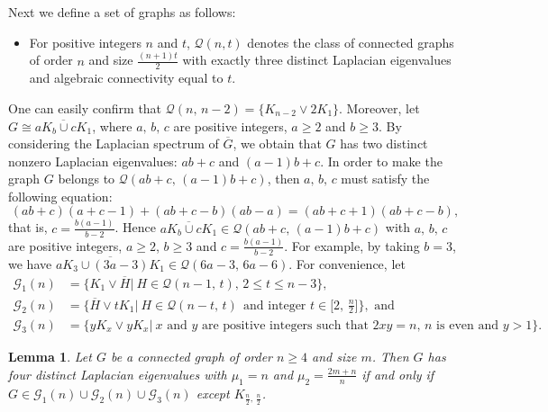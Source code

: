\documentclass[12pt]{article}
\newtheorem{lemma}[theorem]{Lemma}
\begin{document}
Next we  define a set of graphs as follows:
\begin{itemize}
 \item For positive integers $n$ and $t$, $\mathcal{Q}(n,t)$ denotes the class of connected graphs of order $n$ and size $\frac{(n+1)t}{2}$ with exactly three distinct Laplacian eigenvalues and algebraic connectivity equal to $t$. 
\end{itemize}
One can easily confirm that  $\mathcal{Q}(n,\,n-2)=\{K_{n-2}\vee 2K_1\}$.
Moreover, let $G\cong \overline{aK_b\cup cK_1}$, where $a,\,b,\,c$ are positive integers, $a\geq 2$ and $b\geq 3$. By considering the Laplacian spectrum of $\overline{G}$, we obtain that $G$ has two distinct nonzero Laplacian eigenvalues: $ab+c$ and $(a-1)b+c$. In order to make the graph $G$ belongs to 
$\mathcal{Q}(ab+c,\,(a-1)b+c)$, then $a,\,b,\,c$ must satisfy the following equation: 
$$(ab+c)(a+c-1)+(ab+c-b)(ab-a)=(ab+c+1)(ab+c-b),$$
that is, $c=\frac{b(a-1)}{b-2}$. Hence $\overline{aK_b\cup cK_1}\in \mathcal{Q}(ab+c,\,(a-1)b+c)$ with $a,\,b,\,c$ are positive integers, $a\geq 2$, $b\geq 3$ and $c=\frac{b(a-1)}{b-2}$. For example, by taking $b=3$, we have 
$\overline{aK_3\cup (3a-3)K_1}\in \mathcal{Q}(6a-3,\,6a-6)$.
 For convenience, let
 \begin{align*}
 \mathcal{G}_1(n)&=\Big\{K_1\vee\overline{H}|~H\in \mathcal{Q}(n-1,\,t),\,2\leq t\leq n-3\Big\},\\[2mm]
 \mathcal{G}_2(n)&=\Bigg\{\overline{H}\vee tK_1|~H\in \mathcal{Q}(n-t,\,t)~~\mbox{and integer } t\in \Big[2,\,\frac{n}{2}\Big]\Bigg\},\mbox{ and }\\[3mm]
 \mathcal{G}_3(n)&=\Big\{yK_x\vee yK_x|~\mbox{$x$ and $y$ are positive integers such that $2xy=n$, $n$ is even and $y>1$} \Big\}.
 \end{align*}

\begin{lemma} \label{nlesundas2}
    Let $G$ be a connected graph of order $n\geq 4$ and size $m$. Then $G$ has four distinct Laplacian eigenvalues with $\mu_1=n$ and $\mu_2=\frac{2m+n}{n}$ if and only if
    $G\in \mathcal{G}_1(n)\cup\mathcal{G}_2(n)\cup\mathcal{G}_3(n)$ except $K_{\frac{n}{2},\,\frac{n}{2}}$.
    \end{lemma}
    
\end{document}
